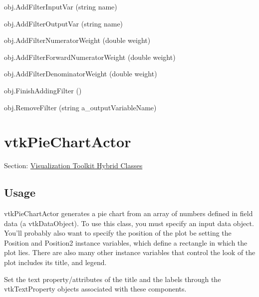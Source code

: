 \begin{DoxyItemize}
\item {\ttfamily obj.\-Add\-Filter\-Input\-Var (string name)}  
\item {\ttfamily obj.\-Add\-Filter\-Output\-Var (string name)}  
\item {\ttfamily obj.\-Add\-Filter\-Numerator\-Weight (double weight)}  
\item {\ttfamily obj.\-Add\-Filter\-Forward\-Numerator\-Weight (double weight)}  
\item {\ttfamily obj.\-Add\-Filter\-Denominator\-Weight (double weight)}  
\item {\ttfamily obj.\-Finish\-Adding\-Filter ()}  
\item {\ttfamily obj.\-Remove\-Filter (string a\-\_\-output\-Variable\-Name)}  
\end{DoxyItemize}\hypertarget{vtkhybrid_vtkpiechartactor}{}\section{vtk\-Pie\-Chart\-Actor}\label{vtkhybrid_vtkpiechartactor}
Section\-: \hyperlink{sec_vtkhybrid}{Visualization Toolkit Hybrid Classes} \hypertarget{vtkwidgets_vtkxyplotwidget_Usage}{}\subsection{Usage}\label{vtkwidgets_vtkxyplotwidget_Usage}
vtk\-Pie\-Chart\-Actor generates a pie chart from an array of numbers defined in field data (a vtk\-Data\-Object). To use this class, you must specify an input data object. You'll probably also want to specify the position of the plot be setting the Position and Position2 instance variables, which define a rectangle in which the plot lies. There are also many other instance variables that control the look of the plot includes its title, and legend.

Set the text property/attributes of the title and the labels through the vtk\-Text\-Property objects associated with these components.

